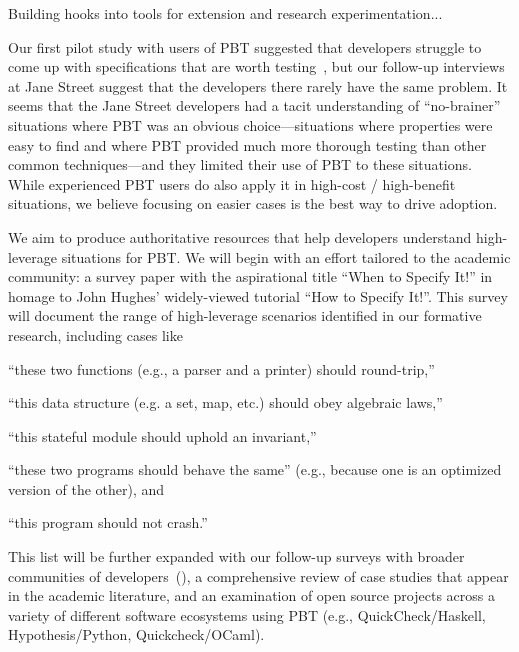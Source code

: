 Building hooks into tools for extension and research experimentation...
\fi



%
Our first pilot study with users of PBT suggested that developers struggle to
come up with specifications that are worth
testing~\cite{goldstein_problems_2022},
but
our follow-up interviews at Jane Street suggest that the developers there
rarely have the same problem. It seems that the Jane Street developers had
a tacit
understanding of ``no-brainer'' situations where PBT was an obvious
choice---situations where properties were easy to find and where PBT provided
much more thorough testing than other common techniques---and they limited their
use of PBT to these situations.
While experienced PBT users do also apply it in
high-cost / high-benefit situations, we believe
focusing on easier cases is the best way to drive adoption.

We aim to produce authoritative resources that help developers understand
high-leverage situations for PBT. We will begin with an effort
tailored to the academic community: a survey paper with the
aspirational title ``When to Specify It!'' in homage to John Hughes'
widely-viewed tutorial ``How to Specify It!''. This survey will
document the range of high-leverage scenarios identified in our formative
research, including cases like
\begin{enumerate*}[label=(\arabic{enumi})]
\item ``these two functions (e.g., a parser and a printer) should round-trip,''
\item ``this data structure (e.g. a set, map, etc.) should obey algebraic laws,''
\item ``this stateful module should uphold an invariant,''
\item ``these two programs should behave the same'' (e.g., because one
is an optimized version of the other),
and
\item ``this program should not crash.''
\end{enumerate*}
This list will be further expanded with our follow-up surveys with broader
communities of developers~(), a comprehensive
review of case studies that appear in
the academic literature, and an examination of open source projects across a
variety of different software ecosystems using PBT (e.g.,
QuickCheck/Haskell, Hypothesis/Python, Quickcheck/OCaml).

